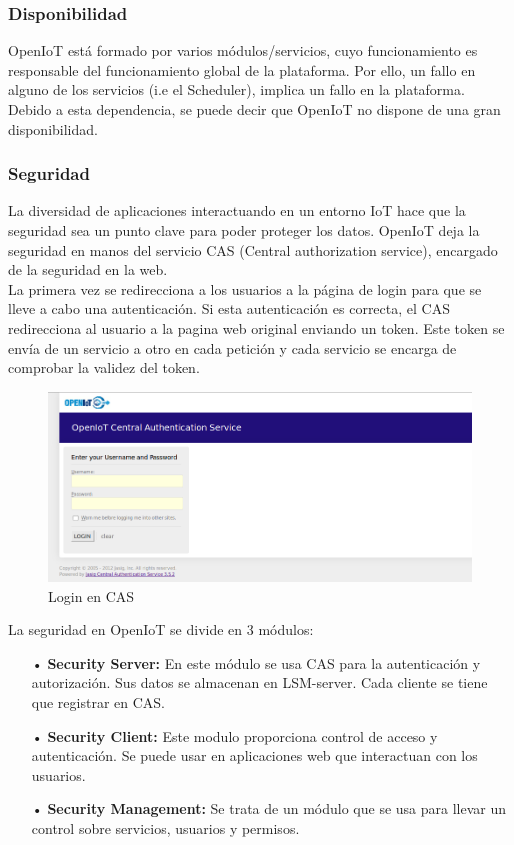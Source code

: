 \documentclass[12pt, twoside]{book}
\begin{document}
\subsubsection*{Disponibilidad}
OpenIoT está formado por varios módulos/servicios, cuyo funcionamiento es responsable del funcionamiento global de la plataforma. Por ello, un fallo en alguno de los servicios (i.e el Scheduler), implica un fallo en la plataforma. 
Debido a esta dependencia, se puede decir que OpenIoT no dispone de una gran disponibilidad.
\subsubsection*{Seguridad}
La diversidad de aplicaciones interactuando en un entorno IoT hace que la seguridad sea un punto clave para poder proteger los datos. OpenIoT deja la seguridad en manos del servicio CAS (Central authorization service), encargado de la seguridad en la web.\\

La primera vez se redirecciona a los usuarios a la página de login para que se lleve a cabo una autenticación. Si esta autenticación es correcta, el CAS redirecciona al usuario a la pagina web original enviando un token. Este token se envía de un servicio a otro en cada petición y cada servicio se encarga de comprobar la validez del token.
\begin{figure}[H]
\centering
\includegraphics[scale=0.5]{images/login_capture}
\caption{Login en CAS}\label{L410}
\end{figure}
La seguridad en OpenIoT se divide en 3 módulos:
\begin{itemize}
\item[•]\textbf{Security Server:} En este módulo se usa CAS para la autenticación y autorización. Sus datos se almacenan en LSM-server. Cada cliente se tiene que registrar en CAS.
\item[•] \textbf{Security Client:} Este modulo proporciona control de acceso y autenticación. Se puede usar en aplicaciones web que interactuan con los usuarios.  
\item[•] \textbf{Security Management:} Se trata de un módulo que se usa para llevar un control sobre servicios, usuarios y permisos.
\end{itemize}
\end{document}
